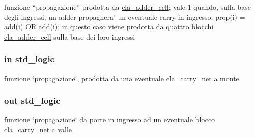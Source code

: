 funzione “propagazione” prodotta da \hyperlink{classcla__adder__cell}{cla\+\_\+adder\+\_\+cell}; vale 1 quando, sulla base degli ingressi, un adder propaghera' un eventuale carry in ingresso; prop(i) = add(i) O\+R add(i); in questo caso viene prodotta da quattro blocchi \hyperlink{classcla__adder__cell}{cla\+\_\+adder\+\_\+cell} sulla base dei loro ingressi 

\hypertarget{group___carry_network_ga422e8e7ee01fc7ac7b7390cd2ad8c87b}{
\subsubsection[{propin}]{ {\bfseries \textcolor{vhdlchar}{in}\textcolor{vhdlchar}{ }} {\bfseries \textcolor{vhdlchar}{std\+\_\+logic}\textcolor{vhdlchar}{ }} \hspace{0.3cm}{\ttfamily [Port]}}}\label{group___carry_network_ga422e8e7ee01fc7ac7b7390cd2ad8c87b}


funzione \char`\"{}propagazione\char`\"{}, prodotta da una eventuale \hyperlink{classcla__carry__net}{cla\+\_\+carry\+\_\+net} a monte 

\hypertarget{group___carry_network_ga5957c9cdd706cafd2da8855133a002c9}{
\subsubsection[{propout}]{ {\bfseries \textcolor{vhdlchar}{out}\textcolor{vhdlchar}{ }} {\bfseries \textcolor{vhdlchar}{std\+\_\+logic}\textcolor{vhdlchar}{ }} \hspace{0.3cm}{\ttfamily [Port]}}}\label{group___carry_network_ga5957c9cdd706cafd2da8855133a002c9}


funzione \char`\"{}propagazione\char`\"{} da porre in ingresso ad un eventuale blocco \hyperlink{classcla__carry__net}{cla\+\_\+carry\+\_\+net} a valle 

